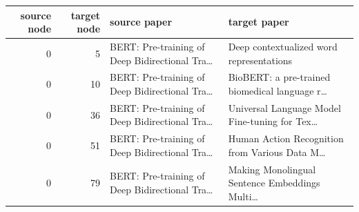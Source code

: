 \begin{tabular}{rrll}
\toprule
source node & target node & source paper & target paper \\
\midrule
0 & 5 & BERT: Pre-training of Deep Bidirectional Tra… & Deep contextualized word representations \\
0 & 10 & BERT: Pre-training of Deep Bidirectional Tra… & BioBERT: a pre-trained biomedical language r… \\
0 & 36 & BERT: Pre-training of Deep Bidirectional Tra… & Universal Language Model Fine-tuning for Tex… \\
0 & 51 & BERT: Pre-training of Deep Bidirectional Tra… & Human Action Recognition from Various Data M… \\
0 & 79 & BERT: Pre-training of Deep Bidirectional Tra… & Making Monolingual Sentence Embeddings Multi… \\
\bottomrule
\end{tabular}
